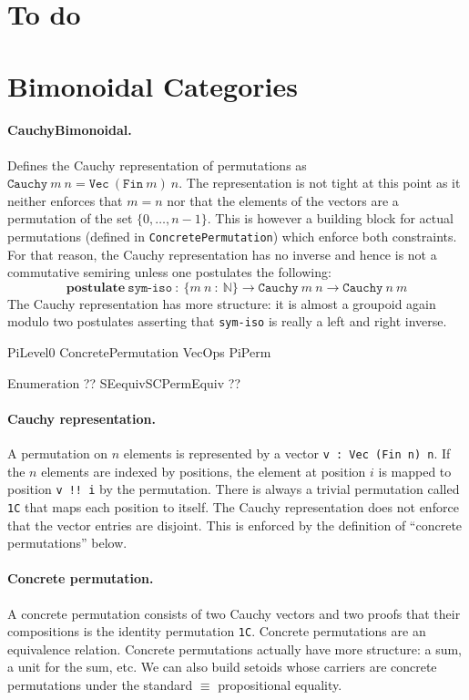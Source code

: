 \documentclass{article}
\begin{document}
\section{To do}

\section{Bimonoidal Categories} 

\paragraph*{CauchyBimonoidal.} Defines the Cauchy representation of
permutations as
$\texttt{Cauchy}~m~n = \texttt{Vec}~(\texttt{Fin}~m)~n$. The
representation is not tight at this point as it neither enforces that
$m=n$ nor that the elements of the vectors are a permutation of the
set $\{0,\ldots,n-1\}$. This is however a building block for actual
permutations (defined in \texttt{ConcretePermutation}) which enforce
both constraints. For that reason, the Cauchy representation has no
inverse and hence is not a commutative semiring unless one postulates
the following:
\[
\textbf{postulate}~\texttt{sym-iso}~:~\{m~n~:~\mathbb{N}\} \rightarrow
  \texttt{Cauchy}~m~n \rightarrow \texttt{Cauchy}~n~m
\]
The Cauchy representation has more structure: it is almost a groupoid
again modulo two postulates asserting that \texttt{sym-iso} is really
a left and right inverse.

PiLevel0
ConcretePermutation
VecOps
PiPerm

Enumeration ??
SEequivSCPermEquiv ??

\paragraph*{Cauchy representation.} A permutation on $n$ elements is
represented by a vector \texttt{v : Vec (Fin n) n}. If the $n$
elements are indexed by positions, the element at position $i$ is
mapped to position \texttt{v !! i} by the permutation. There is always
a trivial permutation called \texttt{1C} that maps each position to
itself. The Cauchy representation does not enforce that the vector
entries are disjoint. This is enforced by the definition of ``concrete
permutations'' below.

\paragraph*{Concrete permutation.} A concrete permutation consists of
two Cauchy vectors and two proofs that their compositions is the
identity permutation \texttt{1C}. Concrete permutations are an
equivalence relation. Concrete permutations actually have more
structure: a sum, a unit for the sum, etc. We can also build setoids
whose carriers are concrete permutations under the standard $\equiv$
propositional equality.

\end{document}
